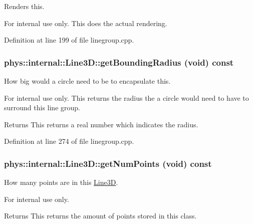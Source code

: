 Renders this. 

\begin{DoxyInternal}{For internal use only.}
This does the actual rendering. \end{DoxyInternal}


Definition at line 199 of file linegroup.cpp.

\hypertarget{classphys_1_1internal_1_1Line3D_a3fdd0ff2b7b22cebc71f796431afc7c8}{
\subsubsection[{getBoundingRadius}]{ phys::internal::Line3D::getBoundingRadius (void) const}}
\label{d4/db5/classphys_1_1internal_1_1Line3D_a3fdd0ff2b7b22cebc71f796431afc7c8}


How big would a circle need to be to encapsulate this. 

\begin{DoxyInternal}{For internal use only.}
This returns the radius the a circle would need to have to surround this line group. \begin{DoxyReturn}{Returns}
This returns a real number which indicates the radius. 
\end{DoxyReturn}
\end{DoxyInternal}


Definition at line 274 of file linegroup.cpp.

\hypertarget{classphys_1_1internal_1_1Line3D_ab72a9dab3a355035c24c15e4a737ea2f}{
\subsubsection[{getNumPoints}]{ phys::internal::Line3D::getNumPoints (void) const}}
\label{d4/db5/classphys_1_1internal_1_1Line3D_ab72a9dab3a355035c24c15e4a737ea2f}


How many points are in this \hyperlink{classphys_1_1internal_1_1Line3D}{Line3D}. 

\begin{DoxyInternal}{For internal use only.}
\begin{DoxyReturn}{Returns}
This returns the amount of points stored in this class. 
\end{DoxyReturn}
\end{DoxyInternal}


